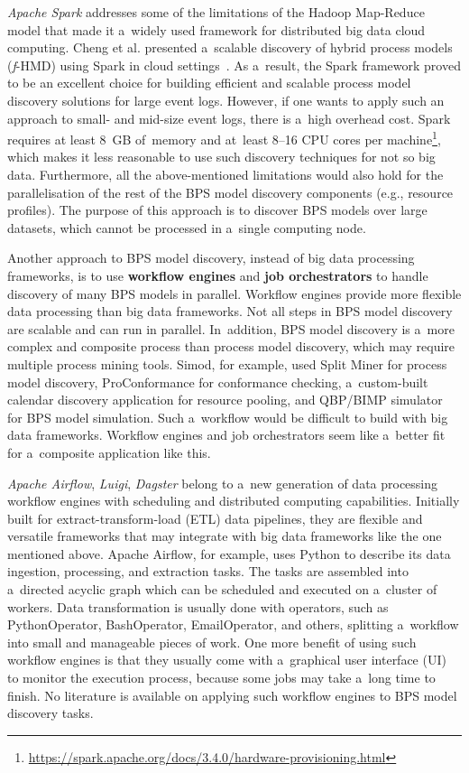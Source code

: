 \documentclass[12pt]{article}
\begin{document}
\emph{Apache Spark} addresses some of the limitations of the Hadoop Map-Reduce model that made it a~widely used framework for distributed big data cloud computing. 
Cheng et al. presented a~scalable discovery of hybrid process models (\emph{f}-HMD) using Spark in cloud settings~\cite{cheng_scalable_2020}. 
As a~result, the Spark framework proved to be an excellent choice for building efficient and scalable process model discovery solutions for large event logs. 
However, if one wants to apply such an approach to small- and mid-size event logs, there is a~high overhead cost. 
Spark requires at least 8~GB of~memory and at~least 8--16 CPU cores per machine\footnote{\href{https://spark.apache.org/docs/3.4.0/hardware-provisioning.html}{https://spark.apache.org/docs/3.4.0/hardware-provisioning.html}}, which makes it less reasonable to use such discovery techniques for not so big data. 
Furthermore, all the above-mentioned limitations would also hold for the parallelisation of the rest of the BPS model discovery components (e.g., resource profiles).
The purpose of this approach is to discover BPS models over large datasets, which cannot be processed in a~single computing node.

Another approach to BPS model discovery, instead of big data processing frameworks, is to use \textbf{workflow engines} and \textbf{job orchestrators} to handle discovery of many BPS models in parallel.
Workflow engines provide more flexible data processing than big data frameworks. 
Not all steps in BPS model discovery are scalable and can run in parallel. 
In~addition, BPS model discovery is a~more complex and composite process than process model discovery, which may require multiple process mining tools. 
Simod, for example, used Split Miner for process model discovery, ProConformance for conformance checking, a~custom-built calendar discovery application for resource pooling, and QBP/BIMP simulator for BPS model simulation. 
Such a~workflow would be difficult to build with big data frameworks. 
Workflow engines and job orchestrators seem like a~better fit for a~composite application like this.

\emph{Apache Airflow}, \emph{Luigi}, \emph{Dagster} belong to a~new generation of data processing workflow engines with scheduling and distributed computing capabilities. Initially built for extract-transform-load (ETL) data pipelines, they are flexible and versatile frameworks that may integrate with big data frameworks like the one mentioned above. Apache Airflow, for example, uses Python to describe its data ingestion, processing, and extraction tasks. The tasks are assembled into a~directed acyclic graph which can be scheduled and executed on a~cluster of workers. Data transformation is usually done with operators, such as PythonOperator, BashOperator, EmailOperator, and others, splitting a~workflow into small and manageable pieces of work. One more benefit of using such workflow engines is that they usually come with a~graphical user interface (UI) to monitor the execution process, because some jobs may take a~long time to finish. No literature is available on applying such workflow engines to BPS model discovery tasks.
\end{document}
